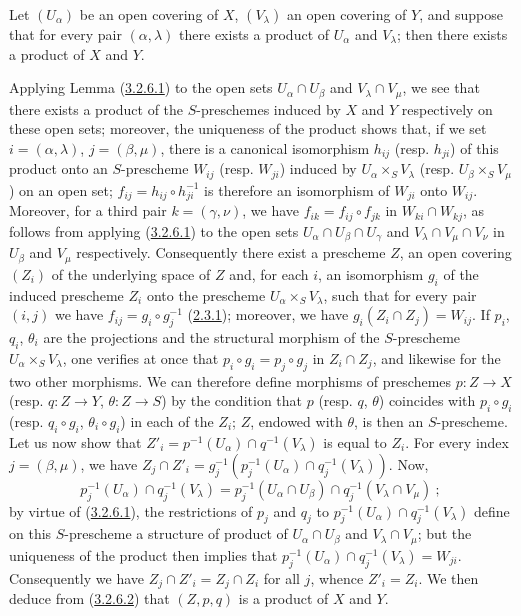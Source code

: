 \begin{lemma}[3.2.6.3]
\label{I.3.2.6.3}
Let $(U_\alpha)$ be an open covering of $X$, $(V_\lambda)$ an open
covering of $Y$, and suppose that for every pair
$(\alpha,\lambda)$ there exists a product of $U_\alpha$ and $V_\lambda$;
then there exists a product of $X$ and $Y$.
\end{lemma}

Applying Lemma (\hyperref[I.3.2.6.1]{3.2.6.1}) to the open sets
$U_\alpha\cap U_\beta$ and $V_\lambda\cap V_\mu$, we see that there exists a
product of the $S$-preschemes induced by $X$ and $Y$ respectively on these
open sets; moreover, the uniqueness of the product shows that, if we set
$i=(\alpha,\lambda)$, $j=(\beta,\mu)$, there is a canonical isomorphism
$h_{ij}$ (resp. $h_{ji}$) of this product onto an $S$-prescheme $W_{ij}$
(resp. $W_{ji}$) induced by $U_\alpha\times_S V_\lambda$
(resp. $U_\beta\times_S V_\mu$) on an open set;
$f_{ij}=h_{ij}\circ h_{ji}^{-1}$ is therefore an isomorphism of $W_{ji}$ onto
$W_{ij}$. Moreover, for a third pair $k=(\gamma,\nu)$, we have
$f_{ik}=f_{ij}\circ f_{jk}$ in $W_{ki}\cap W_{kj}$, as follows from
applying (\hyperref[I.3.2.6.1]{3.2.6.1}) to the open sets
$U_\alpha\cap U_\beta\cap U_\gamma$ and
$V_\lambda\cap V_\mu\cap V_\nu$ in $U_\beta$ and $V_\mu$
respectively. Consequently there exist a prescheme $Z$, an open covering
$(Z_i)$ of the underlying space of $Z$ and, for each $i$, an isomorphism $g_i$
of the induced prescheme $Z_i$ onto the prescheme
$U_\alpha\times_S V_\lambda$, such that for every pair $(i,j)$ we have
$f_{ij}=g_i\circ g_j^{-1}$
(\hyperref[I.2.3.1]{2.3.1}); moreover, we have
$g_i(Z_i\cap Z_j)=W_{ij}$. If $p_i$, $q_i$, $\theta_i$ are the projections
and the structural morphism of the $S$-prescheme
$U_\alpha\times_S V_\lambda$, one verifies at once that
$p_i\circ g_i=p_j\circ g_j$ in $Z_i\cap Z_j$, and likewise for the two
other morphisms. We can therefore define morphisms of preschemes
$p:Z\to X$ (resp. $q:Z\to Y$, $\theta:Z\to S$) by the condition that $p$
(resp. $q$, $\theta$) coincides with $p_i\circ g_i$
(resp. $q_i\circ g_i$, $\theta_i\circ g_i$) in each of the $Z_i$; $Z$,
endowed with $\theta$, is then an $S$-prescheme. Let us now show that
$Z'_i=p^{-1}(U_\alpha)\cap q^{-1}(V_\lambda)$ is equal to $Z_i$. For every
index $j=(\beta,\mu)$, we have
$Z_j\cap Z'_i=g_j^{-1}(p_j^{-1}(U_\alpha)\cap q_j^{-1}(V_\lambda))$. Now,
\[
  p_j^{-1}(U_\alpha)\cap q_j^{-1}(V_\lambda)
  =p_j^{-1}(U_\alpha\cap U_\beta)\cap
   q_j^{-1}(V_\lambda\cap V_\mu)~;
\]
by virtue of (\hyperref[I.3.2.6.1]{3.2.6.1}), the restrictions of $p_j$ and
$q_j$ to
$p_j^{-1}(U_\alpha)\cap q_j^{-1}(V_\lambda)$ define on this
$S$-prescheme a structure of product of $U_\alpha\cap U_\beta$ and
$V_\lambda\cap V_\mu$; but the uniqueness of the product then implies that
$p_j^{-1}(U_\alpha)\cap q_j^{-1}(V_\lambda)=W_{ji}$. Consequently we have
$Z_j\cap Z'_i=Z_j\cap Z_i$ for all $j$, whence $Z'_i=Z_i$. We then deduce
from (\hyperref[I.3.2.6.2]{3.2.6.2}) that $(Z,p,q)$ is a product of $X$ and
$Y$.

